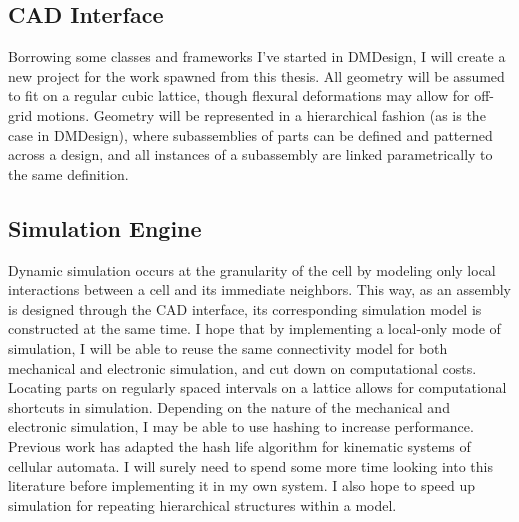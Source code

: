 {\subsection{CAD Interface}


Borrowing some classes and frameworks I've started in DMDesign, I will create a new project for the work spawned from this thesis.  All geometry will be assumed to fit on a regular cubic lattice, though flexural deformations may allow for off-grid motions.  Geometry will be represented in a hierarchical fashion (as is the case in DMDesign), where subassemblies of parts can be defined and patterned across a design, and all instances of a subassembly are linked parametrically to the same definition.



\subsection{Simulation Engine}

Dynamic simulation occurs at the granularity of the cell by modeling only local interactions between a cell and its immediate neighbors.  This way, as an assembly is designed through the CAD interface, its corresponding simulation model is constructed at the same time.  I hope that by implementing a local-only mode of simulation, I will be able to reuse the same connectivity model for both mechanical and electronic simulation, and cut down on computational costs.
\\

Locating parts on regularly spaced intervals on a lattice allows for computational shortcuts in simulation.  Depending on the nature of the mechanical and electronic simulation, I may be able to use hashing to increase performance\cite{Gosper1984}.  Previous work has adapted the hash life algorithm for kinematic systems of cellular automata\cite{Stevens2010}.  I will surely need to spend some more time looking into this literature before implementing it in my own system.  I also hope to speed up simulation for repeating hierarchical structures within a model.
\\

}
